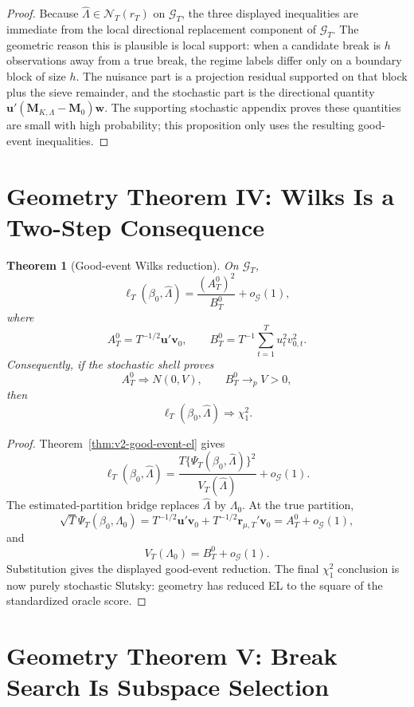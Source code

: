 \documentclass[12pt]{article}
\numberwithin{equation}{section}
\newtheorem{theorem}{Theorem}
\theoremstyle{definition}
\begin{document}
\begin{proof}
Because \(\widehat\Lambda\in\mathcal N_T(r_T)\) on \(\mathcal G_T\), the three
displayed inequalities are immediate from the local directional replacement
component of \(\mathcal G_T\). The geometric reason this is plausible is local
support: when a candidate break is \(h\) observations away from a true break,
the regime labels differ only on a boundary block of size \(h\). The nuisance
part is a projection residual supported on that block plus the sieve remainder,
and the stochastic part is the directional quantity
\(\bm u'(\bm M_{K,\Lambda}-\bm M_0)\bm w\). The supporting stochastic appendix proves these quantities are small with high probability; this proposition only uses the resulting good-event inequalities.
\end{proof}

\section{Geometry Theorem IV: Wilks Is a Two-Step Consequence}

\begin{theorem}[Good-event Wilks reduction]
\label{thm:v2-good-event-wilks-reduction}
On \(\mathcal G_T\),
\[
    \ell_T(\beta_0,\widehat\Lambda)
    =\frac{(A_T^0)^2}{B_T^0}+o_{\mathcal G}(1),
\]
where
\[
    A_T^0=T^{-1/2}\bm u'\bm v_0,
    \qquad
    B_T^0=T^{-1}\sum_{t=1}^T u_t^2v_{0,t}^2.
\]
Consequently, if the stochastic shell proves
\[
    A_T^0\Rightarrow N(0,V),
    \qquad B_T^0\to_p V>0,
\]
then
\[
    \ell_T(\beta_0,\widehat\Lambda)\Rightarrow\chi_1^2.
\]
\end{theorem}

\begin{proof}
Theorem~\ref{thm:v2-good-event-el} gives
\[
    \ell_T(\beta_0,\widehat\Lambda)
    =\frac{T\{\Psi_T(\beta_0,\widehat\Lambda)\}^2}
           {V_T(\widehat\Lambda)}+o_{\mathcal G}(1).
\]
The estimated-partition bridge replaces \(\widehat\Lambda\) by \(\Lambda_0\).
At the true partition,
\[
    \sqrt T\Psi_T(\beta_0,\Lambda_0)
    =T^{-1/2}\bm u'\bm v_0
      +T^{-1/2}\bm r_{\mu,T}'\bm v_0
    =A_T^0+o_{\mathcal G}(1),
\]
and
\[
    V_T(\Lambda_0)=B_T^0+o_{\mathcal G}(1).
\]
Substitution gives the displayed good-event reduction. The final
\(\chi_1^2\) conclusion is now purely stochastic Slutsky: geometry has reduced
EL to the square of the standardized oracle score.
\end{proof}

\section{Geometry Theorem V: Break Search Is Subspace Selection}
\end{document}
